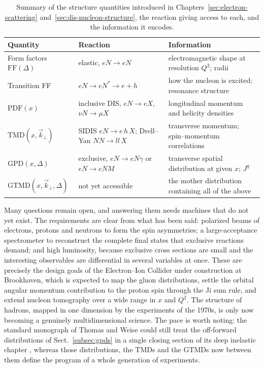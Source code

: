 \begin{table}[t]
    \centering
    \caption{Summary of the structure quantities introduced in
             Chapters~\ref{sec:electron-scattering} and~\ref{sec:dis-nucleon-structure},
             the reaction giving access to each, and the information it encodes.}
    \label{tab:structure-summary}
    \begin{tabular}{@{}L{2.6cm} L{3.5cm} L{4.6cm}@{}}
        \toprule
        Quantity & Reaction & Information \\
        \midrule
        Form factors $\mathrm{FF}(\Delta)$
            & elastic, $eN\to eN$
            & electromagnetic shape at resolution $Q^{2}$; radii \\[2pt]
        Transition FF
            & $eN\to eN^{*}\to e+h$
            & how the nucleon is excited; resonance structure \\[2pt]
        $\mathrm{PDF}(x)$
            & inclusive DIS, $eN\to eX$, $\nu N\to\mu X$
            & longitudinal momentum and helicity densities \\[2pt]
        $\mathrm{TMD}(x,\vec k_{\perp})$
            & SIDIS $eN\to e\,h\,X$; Drell--Yan $NN\to ll\,X$
            & transverse momentum; spin--momentum correlations \\[2pt]
        $\mathrm{GPD}(x,\Delta)$
            & exclusive, $eN\to eN\gamma$ or $eN\to eNM$
            & transverse spatial distribution at given $x$; $J^{q}$ \\[2pt]
        $\mathrm{GTMD}(x,\vec k_{\perp},\Delta)$
            & not yet accessible
            & the mother distribution containing all of the above \\
        \bottomrule
    \end{tabular}
\end{table}

Many questions remain open, and answering them needs machines that do not yet exist. The
requirements are clear from what has been said: polarized beams of electrons, protons and
neutrons to form the spin asymmetries; a large-acceptance spectrometer to reconstruct the
complete final states that exclusive reactions demand; and high luminosity, because
exclusive cross sections are small and the interesting observables are differential in
several variables at once. These are precisely the design goals of the Electron--Ion
Collider under construction at Brookhaven, which is expected to map the gluon
distributions, settle the orbital angular momentum contribution to the proton spin
through the Ji sum rule, and extend nucleon tomography over a wide range in $x$ and
$Q^{2}$. The structure of hadrons, mapped in one dimension by the experiments of the
1970s, is only now becoming a genuinely multidimensional science. The pace is worth
noting: the standard monograph of Thomas and Weise could still treat the off-forward
distributions of Sect.~\ref{subsec:gpds} in a single closing section of its deep
inelastic chapter \cite[Ch.~4.8]{ThomasWeise2001}, whereas those
distributions, the TMDs and the GTMDs now between them define the program of a whole
generation of experiments.


